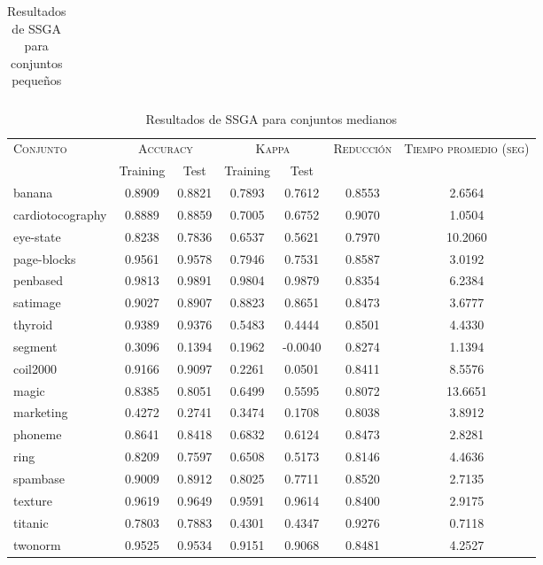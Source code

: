 \begin{table}[]
\begin{tabular}{l c c c c c c}
\hline
\end{tabular}
\caption{Resultados de SSGA para conjuntos pequeños }
\label{res-peq-ssga}
\end{table}


\begin{table}[]
\centering
\begin{tabular}{l c c c c c c}
\hline
\multirow{2}{*}{\textsc{Conjunto}}
	& \multicolumn{2}{c}{\textsc{Accuracy}}
	& \multicolumn{2}{c}{\textsc{Kappa}}
	& \textsc{Reducción}
	& \textsc{Tiempo promedio (seg)} \\
	& Training & Test
	& Training & Test \\ 
\hline
\hline

banana & 0.8909 & 0.8821 & 0.7893 & 0.7612 & 0.8553 & 2.6564 \\
cardiotocography & 0.8889 & 0.8859 & 0.7005 & 0.6752 & 0.9070 & 1.0504 \\
eye-state & 0.8238 & 0.7836 & 0.6537 & 0.5621 & 0.7970 & 10.2060 \\
page-blocks & 0.9561 & 0.9578 & 0.7946 & 0.7531 & 0.8587 & 3.0192 \\
penbased & 0.9813 & 0.9891 & 0.9804 & 0.9879 & 0.8354 & 6.2384 \\
satimage & 0.9027 & 0.8907 & 0.8823 & 0.8651 & 0.8473 & 3.6777 \\
thyroid & 0.9389 & 0.9376 & 0.5483 & 0.4444 & 0.8501 & 4.4330 \\
segment & 0.3096 & 0.1394 & 0.1962 & -0.0040 & 0.8274 & 1.1394 \\
coil2000 & 0.9166 & 0.9097 & 0.2261 & 0.0501 & 0.8411 & 8.5576 \\
magic & 0.8385 & 0.8051 & 0.6499 & 0.5595 & 0.8072 & 13.6651 \\
marketing & 0.4272 & 0.2741 & 0.3474 & 0.1708 & 0.8038 & 3.8912 \\
phoneme & 0.8641 & 0.8418 & 0.6832 & 0.6124 & 0.8473 & 2.8281 \\
ring & 0.8209 & 0.7597 & 0.6508 & 0.5173 & 0.8146 & 4.4636 \\
spambase & 0.9009 & 0.8912 & 0.8025 & 0.7711 & 0.8520 & 2.7135 \\
texture & 0.9619 & 0.9649 & 0.9591 & 0.9614 & 0.8400 & 2.9175 \\
titanic & 0.7803 & 0.7883 & 0.4301 & 0.4347 & 0.9276 & 0.7118 \\
twonorm & 0.9525 & 0.9534 & 0.9151 & 0.9068 & 0.8481 & 4.2527 \\

\hline
\end{tabular}
\caption{Resultados de SSGA para conjuntos medianos }
\label{res-med-ssga}
\end{table}


